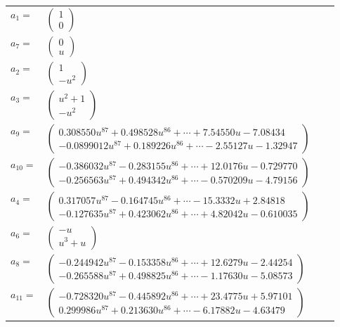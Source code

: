 \documentclass[1p]{elsarticle_modified}
\theoremstyle{definition}
\begin{document}
\begin{tabular}{m{7pt} m{180pt} m{7pt} m{180pt} }
\flushright $a_{1}=$&$\begin{pmatrix}1\\0\end{pmatrix}$ \\
\flushright $a_{7}=$&$\begin{pmatrix}0\\u\end{pmatrix}$ \\
\flushright $a_{2}=$&$\begin{pmatrix}1\\- u^2\end{pmatrix}$ \\
\flushright $a_{3}=$&$\begin{pmatrix}u^2+1\\- u^2\end{pmatrix}$ \\
\flushright $a_{9}=$&$\begin{pmatrix}0.308550 u^{87}+0.498528 u^{86}+\cdots+7.54550 u-7.08434\\-0.0899012 u^{87}+0.189226 u^{86}+\cdots-2.55127 u-1.32947\end{pmatrix}$ \\
\flushright $a_{10}=$&$\begin{pmatrix}-0.386032 u^{87}-0.283155 u^{86}+\cdots+12.0176 u-0.729770\\-0.256563 u^{87}+0.494342 u^{86}+\cdots-0.570209 u-4.79156\end{pmatrix}$ \\
\flushright $a_{4}=$&$\begin{pmatrix}0.317057 u^{87}-0.164745 u^{86}+\cdots-15.3332 u+2.84818\\-0.127635 u^{87}+0.423062 u^{86}+\cdots+4.82042 u-0.610035\end{pmatrix}$ \\
\flushright $a_{6}=$&$\begin{pmatrix}- u\\u^3+u\end{pmatrix}$ \\
\flushright $a_{8}=$&$\begin{pmatrix}-0.244942 u^{87}-0.153358 u^{86}+\cdots+12.6279 u-2.44254\\-0.265588 u^{87}+0.498825 u^{86}+\cdots-1.17630 u-5.08573\end{pmatrix}$ \\
\flushright $a_{11}=$&$\begin{pmatrix}-0.728320 u^{87}-0.445892 u^{86}+\cdots+23.4775 u+5.97101\\0.299986 u^{87}+0.213630 u^{86}+\cdots-6.17882 u-4.63479\end{pmatrix}$ \\

\end{tabular}
\end{document}
